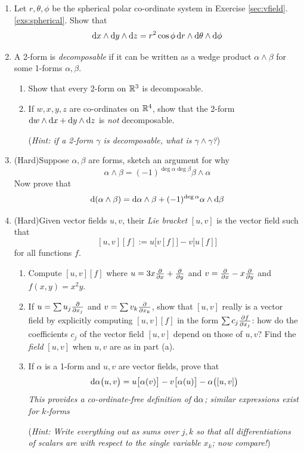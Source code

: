 \begin{exercises}
\begin{enumerate}
		
		\item Let $r,\theta,\phi$ be the spherical polar co-ordinate system in Exercise \ref*{sec:vfield}.\ref{exs:spherical}. Show that 
		\[
			\dx\wedge\dy\wedge\dz=r^2\cos\phi\,\dr\wedge\dth\wedge\D\phi
		\]

	
		\goodbreak
	
		\item A 2-form is \emph{decomposable} if it can be written as a wedge product $\alpha\wedge\beta$ for some 1-forms $\alpha,\beta$.
		\begin{enumerate}
		  \item Show that every 2-form on $\R^3$ is decomposable.
		  
		  \item If $w,x,y,z$ are co-ordinates on $\R^4$, show that the 2-form $\dw\wedge\dx+\dy\wedge\dz$ is \emph{not} decomposable.\par
		  (\emph{Hint: if a 2-form $\gamma$ is decomposable, what is $\gamma\wedge\gamma$?})
		\end{enumerate}
		
	
		
		\item (Hard)\lstsp Suppose $\alpha,\beta$ are forms, sketch an argument for why
		\[
			\alpha\wedge\beta=(-1)^{\deg\alpha\deg\beta}\beta\wedge\alpha
		\]
		Now prove that
		\[
			\D(\alpha\wedge\beta)=\D\alpha\wedge\beta+(-1)^{\deg\alpha}\alpha\wedge\D\beta
		\]
		
			
		
		\item\label{exs:liebracketdalpha} (Hard)\lstsp Given vector fields $u,v$, their \emph{Lie bracket} $[u,v]$ is the vector field such that
		\[
			[u,v][f]:=u\bigl[v[f]\bigr] -v\bigl[u[f]\bigr]
		\]
		for all functions $f$.
		\begin{enumerate}
		  \item Compute $[u,v][f]$ where $u=3x\partials x+\partials y$ and $v=\partials x-x\partials y$ and $f(x,y)=x^2y$.
		  
		  \item If $u=\sum u_j\partials{x_j}$ and $v=\sum v_k\partials{x_k}$, show that $[u,v]$ really is a vector field by explicitly computing $[u,v][f]$ in the form $\sum c_j\partials[f]{x_j}$: how do the coefficients $c_j$ of the vector field $[u,v]$ depend on those of $u,v$? Find the \emph{field} $[u,v]$ when $u,v$ are as in part (a).
		  
		  \item If $\alpha$ is a 1-form and $u,v$ are vector fields, prove that
		  \[
		  	\D\alpha\bigl(u,v\bigr)=u\bigl[\alpha(v)\bigr]-v\bigl[\alpha(u)\bigr]-\alpha\bigl([u,v]\bigl)
		  \]
		  \emph{This provides a co-ordinate-free definition of $\D\alpha$; similar expressions exist for $k$-forms}\par
		  (\emph{Hint: Write everything out as sums over $j,k$ so that all differentiations of scalars are with respect to the single variable $x_k$; now compare!})
		\end{enumerate}
		
	\end{enumerate}
\end{exercises}

